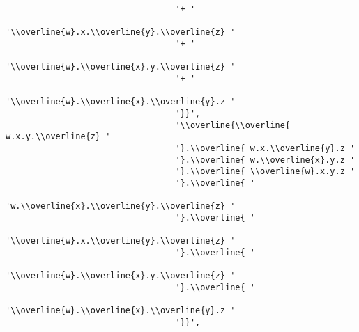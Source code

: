 \begin{verbatim}
                                  '+ '
                                  '\\overline{w}.x.\\overline{y}.\\overline{z} '
                                  '+ '
                                  '\\overline{w}.\\overline{x}.y.\\overline{z} '
                                  '+ '
                                  '\\overline{w}.\\overline{x}.\\overline{y}.z '
                                  '}}',
                                  '\\overline{\\overline{ w.x.y.\\overline{z} '
                                  '}.\\overline{ w.x.\\overline{y}.z '
                                  '}.\\overline{ w.\\overline{x}.y.z '
                                  '}.\\overline{ \\overline{w}.x.y.z '
                                  '}.\\overline{ '
                                  'w.\\overline{x}.\\overline{y}.\\overline{z} '
                                  '}.\\overline{ '
                                  '\\overline{w}.x.\\overline{y}.\\overline{z} '
                                  '}.\\overline{ '
                                  '\\overline{w}.\\overline{x}.y.\\overline{z} '
                                  '}.\\overline{ '
                                  '\\overline{w}.\\overline{x}.\\overline{y}.z '
                                  '}}',

\end{verbatim}
